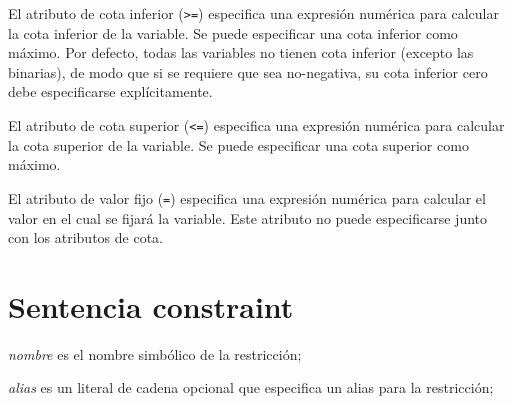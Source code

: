 \documentclass[11pt,spanish]{report}
\begin{document}
El atributo de cota inferior ({\tt>=}) especifica una expresión numérica para calcular la cota inferior de la variable. Se puede especificar una cota inferior como máximo. Por defecto, todas las variables no tienen cota inferior (excepto las binarias), de modo que si se requiere que sea no-negativa, su cota inferior cero debe especificarse explícitamente.

El atributo de cota superior ({\tt<=}) especifica una expresión numérica para calcular la cota superior de la variable. Se puede especificar una cota superior como máximo.

El atributo de valor fijo ({\tt=}) especifica una expresión numérica para calcular el valor en el cual se fijará la variable. Este atributo no puede especificarse junto con los atributos de cota.

\section{Sentencia constraint}

\noindent
{}

\medskip

\noindent
{\it nombre} es el nombre simbólico de la restricción;

\noindent
{\it alias} es un literal de cadena opcional que especifica un alias para la restricción;
\end{document}
